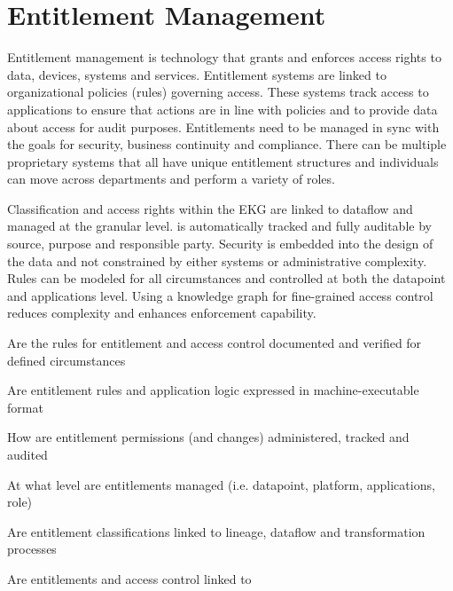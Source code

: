 \section{Entitlement Management}\label{sec:ekgmm-b-4-4} %

Entitlement management is technology that grants and enforces access rights to data, devices, systems and services.
Entitlement systems are linked to organizational policies (rules) governing access.
These systems track access to applications to ensure that actions are in line with policies and to provide data
about access for audit purposes.
Entitlements need to be managed in sync with the goals for security, business continuity and compliance.
There can be multiple proprietary systems that all have unique entitlement structures and
individuals can move across departments and perform a variety of roles.

\kgmmekgrationalesection

Classification and access rights within the EKG are linked to dataflow and managed at the granular level.
 is automatically tracked and fully auditable by source, purpose and responsible party.
Security is embedded into the design of the data and not constrained by either systems or administrative complexity.
Rules can be modeled for all circumstances and controlled at both the datapoint and applications level.
Using a knowledge graph for fine-grained access control reduces complexity and enhances enforcement capability.

\kgmmcorequestionssection

\begin{core-questions}

  \item [\thesection.1] Are the rules for entitlement and access control documented and verified for defined circumstances
  \item [\thesection.2] Are entitlement rules and application logic expressed in machine-executable format
  \item [\thesection.3] How are entitlement permissions (and changes) administered, tracked and audited
  \item [\thesection.4] At what level are entitlements managed (i.e. datapoint, platform, applications, role)
  \item [\thesection.5] Are entitlement classifications linked to lineage, dataflow and transformation processes
  \item [\thesection.6] Are entitlements and access control linked to 

\end{core-questions}

